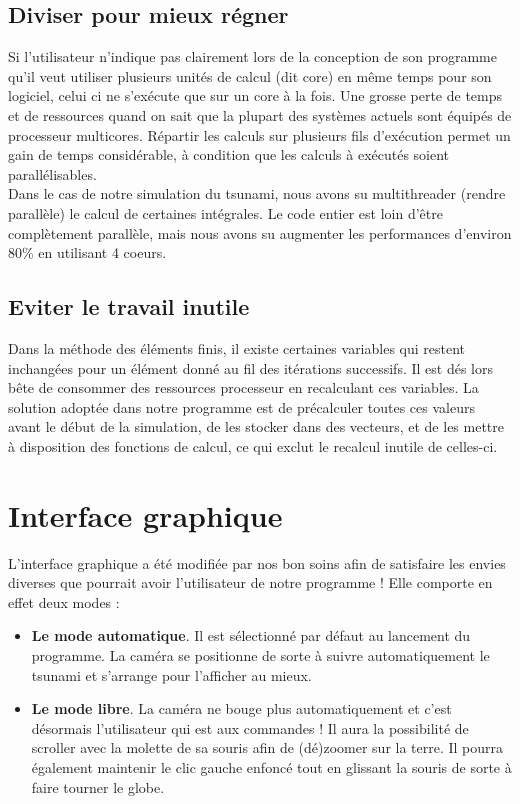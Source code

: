 \documentclass[a4paper,11pt]{article}
\begin{document}
\subsection{Diviser pour mieux régner}

Si l'utilisateur n'indique pas clairement lors de la conception de son programme qu'il veut utiliser plusieurs unités de calcul (dit core) en même temps pour son logiciel, celui ci ne s'exécute que sur un core à la fois. Une grosse perte de temps et de ressources quand on sait que la plupart des systèmes actuels sont équipés de processeur multicores. Répartir les calculs sur plusieurs fils d'exécution permet un gain de temps considérable, à condition que les calculs à exécutés soient parallélisables.\\

Dans le cas de notre simulation du tsunami, nous avons su multithreader (rendre parallèle) le calcul de certaines intégrales. Le code entier est loin d'être complètement parallèle, mais nous avons su augmenter les performances d'environ 80\% en utilisant 4 coeurs.\\

\subsection{Eviter le travail inutile}

Dans la méthode des éléments finis, il existe certaines variables qui restent inchangées pour un élément donné au fil des itérations successifs. Il est dés lors bête de consommer des ressources processeur en recalculant ces variables. La solution adoptée dans notre programme est de précalculer toutes ces valeurs avant le début de la simulation, de les stocker dans des vecteurs, et de les mettre à disposition des fonctions de calcul, ce qui exclut le recalcul inutile de celles-ci.

\section{Interface graphique}

L'interface graphique a été modifiée par nos bon soins afin de satisfaire les envies diverses que pourrait avoir l'utilisateur de notre programme ! Elle comporte en effet deux modes :\\

\begin{itemize}
 \item \textbf{Le mode automatique}. Il est sélectionné par défaut au lancement du programme. La caméra se positionne de sorte à suivre automatiquement le tsunami et s'arrange pour l'afficher au mieux.\\
  \item \textbf{Le mode libre}. La caméra ne bouge plus automatiquement et c'est désormais l'utilisateur qui est aux commandes ! Il aura la possibilité de scroller avec la molette de sa souris afin de (dé)zoomer sur la terre. Il pourra également maintenir le clic gauche enfoncé tout en glissant la souris de sorte à faire tourner le globe.\\
\end{itemize}
\end{document}
